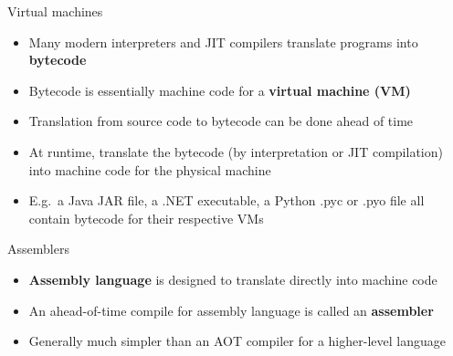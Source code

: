 \begin{frame}{Virtual machines}
	\begin{itemize}
		\pause\item Many modern interpreters and JIT compilers translate programs into \textbf{bytecode}
		\pause\item Bytecode is essentially machine code for a \textbf{virtual machine (VM)}
		\pause\item Translation from source code to bytecode can be done ahead of time
		\pause\item At runtime, translate the bytecode (by interpretation or JIT compilation) into machine code for the physical machine
		\pause\item E.g.\ a Java JAR file, a .NET executable, a Python .pyc or .pyo file
			all contain bytecode for their respective VMs
	\end{itemize}
\end{frame}

\begin{frame}{Assemblers}
	\begin{itemize}
		\pause\item \textbf{Assembly language} is designed to translate directly into machine code
		\pause\item An ahead-of-time compile for assembly language is called an \textbf{assembler}
		\pause\item Generally much simpler than an AOT compiler for a higher-level language
	\end{itemize}
\end{frame}

